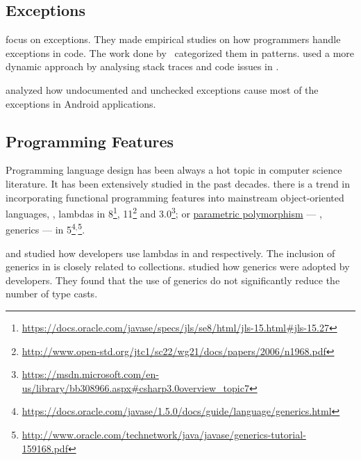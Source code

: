 \subsection*{Exceptions}

\cite{keryExaminingProgrammerPractices2016,asaduzzamanHowDevelopersUse2016} focus on exceptions.
They made empirical studies on how programmers handle exceptions in \java{} code.
The work done by~\cite{nakshatriAnalysisExceptionHandling2016} categorized them in patterns.
\cite{coelhoUnveilingExceptionHandling2015} used a more dynamic approach by analysing stack traces and code issues in \github{}.

\cite{kechagiaUndocumentedUncheckedExceptions2014} analyzed how undocumented and
unchecked exceptions cause most of the exceptions in
Android applications.

\subsection*{ Programming  Features}

Programming language design has been always a hot topic in computer science literature.
It has been extensively studied in the past decades.
there is a trend in incorporating functional programming features into mainstream object-oriented languages, \eg,
lambdas in \java{} 8\footnote{\url{https://docs.oracle.com/javase/specs/jls/se8/html/jls-15.html\#jls-15.27}},
\cpp{}11\footnote{\url{http://www.open-std.org/jtc1/sc22/wg21/docs/papers/2006/n1968.pdf}} and
\cs{} 3.0\footnote{\url{https://msdn.microsoft.com/en-us/library/bb308966.aspx\#csharp3.0overview\_topic7}};
or \underline{parametric polymorphism}   --- \ie{}, generics --- in \java{} 5\footnote{\url{https://docs.oracle.com/javase/1.5.0/docs/guide/language/generics.html}}\(^{,}\)\footnote{\url{http://www.oracle.com/technetwork/java/javase/generics-tutorial-159168.pdf}}.

\cite{mazinanianUnderstandingUseLambda2017} and \cite{uesbeckEmpiricalStudyImpact2016} studied how developers use lambdas in \java{} and \cpp{} respectively.
The inclusion of generics in \java{} is closely related to collections. 
\cite{parninJavaGenericsAdoption2011,parninAdoptionUseJava2013} studied how generics were adopted by \java{} developers.
They found that the use of generics do not significantly reduce the number of type casts.

